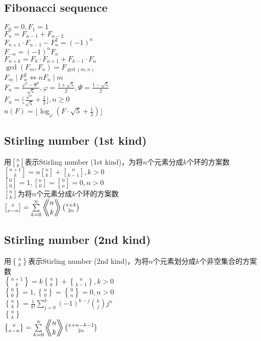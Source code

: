 	\subsection*{Fibonacci sequence}
		$ F_0 = 0, F_1 = 1 $
		\\$ F_n = F_{n - 1} + F_{n - 2} $
		\\$ F_{n + 1} \cdot F_{n - 1} - F_{n}^2 = (-1)^n $
		\\$ F_{-n} = (-1)^n F_n $
		\\$ F_{n + k} = F_k \cdot F_{n + 1} + F_{k - 1} \cdot F_n $
		\\$ \gcd(F_m, F_n) = F_{\gcd(m, n)} $
		\\$ F_m \mid F_n^2 \Leftrightarrow nF_n \mid m $
		\\$ F_n = \frac{\varphi^n - \varPsi^n}{\sqrt{5}}, \varphi = \frac{1 + \sqrt{5}}{2}, \varPsi = \frac{1 - \sqrt{5}}{2} $
		\\$ F_n = \lfloor \frac{\varphi^n}{\sqrt{5}} + \frac{1}{2} \rfloor, n \geq 0 $
		\\$ n(F) = \lfloor \log_\varphi(F \cdot \sqrt{5} + \frac{1}{2}) \rfloor $
	\subsection*{Stirling number (1st kind)}
		用$ {n \brack k} $表示Stirling number (1st kind)，为将$ n $个元素分成$ k $个环的方案数
		\\$ {n + 1 \brack k} = n {n \brack k} + {n \brack k - 1}, k > 0 $
		\\$ {0 \brack 0} = 1, {n \brack 0} = {0 \brack n} = 0, n > 0 $
		\\$ {n \brack k} $为将$ n $个元素分成$ k $个环的方案数
		\\$ {x \brack x - n} = \sum\limits_{k = 0}^{n} \Eularian{n}{k} \binom{x + k}{2 n} $
	\subsection*{Stirling number (2nd kind)}
		用$ {n \brace k} $表示Stirling number (2nd kind)，为将$ n $个元素划分成$ k $个非空集合的方案数
		\\$ {n + 1 \brace k} = k {n \brace k} + {n \brace k - 1}, k > 0 $
		\\$ {0 \brace 0} = 1, {n \brace 0} = {0 \brace n} = 0, n > 0 $
		\\$ {n \brace k} = \frac{1}{k!} \sum\limits_{j = 0}^{k} (-1) ^ {k - j} \binom{k}{j} j^n $
		\\$ {n \brace k} $
		\\$ {x \brace x - n} = \sum\limits_{k = 0}^{n} \Eularian{n}{k} \binom{x + n - k - 1}{2 n} $
